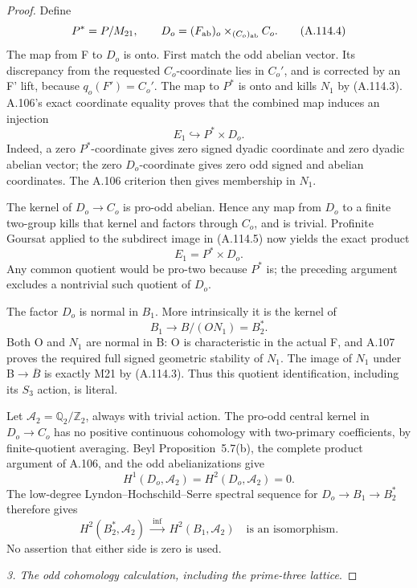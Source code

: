 \begin{proof}
Define
\[
P^*=P/M_{21},\qquad
D_o=(F_{\rm ab})_o\times_{(C_o)_{\rm ab}}C_o.                   \tag{A.114.4}
\]
The map from F to \(D_o\) is onto. First match the odd abelian vector. Its discrepancy from the requested \(C_o\)-coordinate lies in \(C_o'\), and is corrected by an F' lift, because \(q_o(F')=C_o'\). The map to \(P^*\) is onto and kills \(N_1\) by (A.114.3). A.106's exact coordinate equality proves that the combined map induces an injection
\[
E_1\hookrightarrow P^*\times D_o.                             \tag{A.114.5}
\]
Indeed, a zero \(P^*\)-coordinate gives zero signed dyadic coordinate and zero dyadic abelian vector; the zero \(D_o\)-coordinate gives zero odd signed and abelian coordinates. The A.106 criterion then gives membership in \(N_1\).

The kernel of \(D_o\to C_o\) is pro-odd abelian. Hence any map from \(D_o\) to a finite two-group kills that kernel and factors through \(C_o\), and is trivial. Profinite Goursat applied to the subdirect image in (A.114.5) now yields the exact product
\[
E_1=P^*\times D_o.                                            \tag{A.114.6}
\]
Any common quotient would be pro-two because \(P^*\) is; the preceding argument excludes a nontrivial such quotient of \(D_o\).

The factor \(D_o\) is normal in \(B_1\). More intrinsically it is the kernel of
\[
B_1\longrightarrow B/(ON_1)=B_2^*.
\]
Both O and \(N_1\) are normal in B: O is characteristic in the actual F, and A.107 proves the required full signed geometric stability of \(N_1\). The image of \(N_1\) under B\(\to\)\(\overline B\) is exactly M21 by (A.114.3). Thus this quotient identification, including its \(S_3\) action, is literal.

Let \(\mathcal A_2=\mathbb Q_2/\mathbb Z_2\), always with trivial action. The pro-odd central kernel in \(D_o\to C_o\) has no positive continuous cohomology with two-primary coefficients, by finite-quotient averaging. Beyl Proposition~5.7(b), the complete product argument of A.106, and the odd abelianizations give
\[
H^1(D_o,\mathcal A_2)=H^2(D_o,\mathcal A_2)=0.                 \tag{A.114.7}
\]
The low-degree Lyndon--Hochschild--Serre spectral sequence for \(D_o\to B_1\to B_2^*\) therefore gives
\[
H^2(B_2^*,\mathcal A_2)\ \xrightarrow{\ \mathrm{inf}\ }\ 
H^2(B_1,\mathcal A_2)
\quad\text{is an isomorphism}.                               \tag{A.114.8}
\]
No assertion that either side is zero is used.

\medskip\noindent\emph{3. The odd cohomology calculation, including the prime-three lattice}.


\end{proof}
